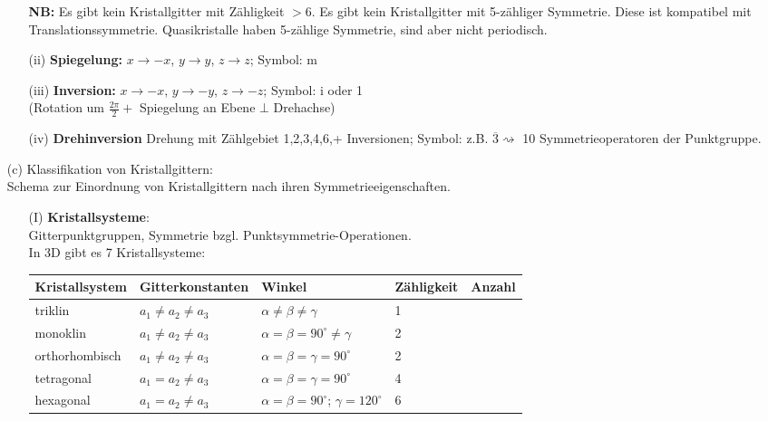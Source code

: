 \begin{itemize}
\begin{itemize}
\begin{table}[H]
                    \end{table}
                    \textbf{NB:} Es gibt kein Kristallgitter mit Zähligkeit $>6$. Es gibt kein Kristallgitter mit 5-zähliger Symmetrie. Diese ist kompatibel mit Translationssymmetrie. Quasikristalle haben 5-zählige Symmetrie, sind aber nicht periodisch.
              \item[(ii)] \textbf{Spiegelung:} $x  \rightarrow  -x$, $y  \rightarrow y$, $z  \rightarrow  z$; Symbol: m
              \item[(iii)] \textbf{Inversion:} $x  \rightarrow  -x$, $y  \rightarrow -y$, $z  \rightarrow  -z$; Symbol: i oder 1\\
                    (Rotation um $\frac{2 \pi}{2} +$ Spiegelung an Ebene $\bot$ Drehachse)
              \item[(iv)] \textbf{Drehinversion} Drehung mit Zählgebiet 1,2,3,4,6,+ Inversionen; Symbol: z.B. $\overline{3} \rightsquigarrow $ 10 Symmetrieoperatoren der Punktgruppe.
          \end{itemize}
    \item[(c)] Klassifikation von Kristallgittern: \\
        Schema zur Einordnung von Kristallgittern nach ihren Symmetrieeigenschaften.
        \begin{itemize}
              \item[(I)] \textbf{Kristallsysteme}: \\ Gitterpunktgruppen, Symmetrie bzgl. Punktsymmetrie-Operationen.\\
              In 3D gibt es 7 Kristallsysteme:
              \begin{table}[H]
                \centering
                \begin{tabular}{l|llll}
                  Kristallsystem & Gitterkonstanten & Winkel & Zähligkeit & Anzahl\\\hline
                  triklin & $a_1 \neq a_2 \neq a_3$ & $\alpha \neq \beta \neq \gamma$ & 1 &  \\
                  monoklin & $a_1 \neq a_2 \neq a_3$ & $\alpha = \beta = 90^{\circ} \neq \gamma$ & 2 &  \\
                  orthorhombisch & $a_1 \neq a_2 \neq a_3$ & $\alpha = \beta = \gamma = 90^{\circ}$ & 2 &  \\
                  tetragonal & $a_1 = a_2 \neq a_3$ & $\alpha = \beta = \gamma = 90^{\circ}$ & 4 &  \\
                  hexagonal & $a_1 = a_2 \neq a_3$ & $\alpha = \beta = 90^{\circ}$; $\gamma = 120^{\circ}$ & 6 &  \\

\end{tabular}
\end{table}
\end{itemize}
\end{itemize}
